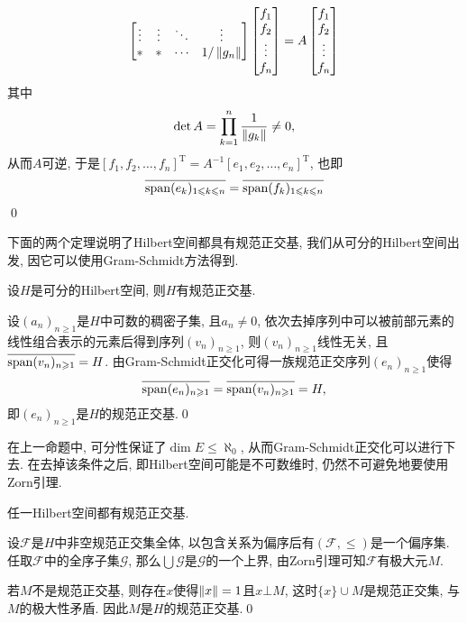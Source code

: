 \begin{Proof}
\[\begin{bmatrix}
			\vdots       & \vdots       & \ddots & \vdots       \\
			\ast         & \ast         & \cdots & 1/\left\| g_n \right\|
		\end{bmatrix}\begin{bmatrix}
			f_1 \\f_2\\\vdots\\f_n
		\end{bmatrix}=A\begin{bmatrix}
			f_1 \\f_2\\\vdots\\f_n
		\end{bmatrix}
	\]
	其中
	\[
		\det A=\prod_{k=1}^n\frac{1}{\left\| g_k \right\|}\ne 0,
	\]
	从而$ A $可逆, 于是$ [f_1,f_2, \dots,f_n]^\mathrm T=A^{-1}[e_1,e_2, \dots,e_n]^\mathrm T $, 也即
	\[
		\overline{\operatorname{span}(e_k)_{1\leqslant k\leqslant n}}=\overline{\operatorname{span}(f_k)_{1\leqslant k\leqslant n}}
	\]
	\qed
\end{Proof}

下面的两个定理说明了Hilbert空间都具有规范正交基, 我们从可分的Hilbert空间出发, 因它可以使用Gram-Schmidt方法得到.

\begin{Proposition}
	设$ H $是可分的Hilbert空间, 则$ H $有规范正交基.
\end{Proposition}
\begin{Proof}
	设$ (a_n)_{n\geqslant 1} $是$ H $中可数的稠密子集, 且$ a_n\ne 0 $, 依次去掉序列中可以被前部元素的线性组合表示的元素后得到序列$ (v_n)_{n\geqslant 1} $, 则$ (v_n)_{n\geqslant 1} $线性无关, 且$ \overline{\operatorname{span}(v_n)_{n\geqslant 1}}=H $. 由Gram-Schmidt正交化可得一族规范正交序列$ (e_n)_{n\geqslant 1} $使得
	\[
		\overline{\operatorname{span}(e_n)_{n\geqslant 1}}=\overline{\operatorname{span}(v_n)_{n\geqslant 1}}=H,
	\]
	即$ (e_n)_{n\geqslant 1} $是$ H $的规范正交基.\qed
\end{Proof}
在上一命题中, 可分性保证了$ \dim E\leqslant\aleph_0 $, 从而Gram-Schmidt正交化可以进行下去. 在去掉该条件之后, 即Hilbert空间可能是不可数维时, 仍然不可避免地要使用Zorn引理.

\begin{Theorem}
	任一Hilbert空间都有规范正交基.
\end{Theorem}
\begin{Proof}
	设$ \mathcal F $是$ H $中非空规范正交集全体, 以包含关系为偏序后有$ (\mathcal F,\leqslant) $是一个偏序集. 任取$ \mathcal F $中的全序子集$ \mathcal G $, 那么$ \bigcup\mathcal G $是$ \mathcal G $的一个上界, 由Zorn引理可知$ \mathcal F $有极大元$ M $.

	若$ M $不是规范正交基, 则存在$ x $使得$ \left\| x \right\|=1 $且$ x\bot M $, 这时$ \{ x \}\cup M $是规范正交集, 与$ M $的极大性矛盾. 因此$ M $是$ H $的规范正交基.\qed
\end{Proof}

